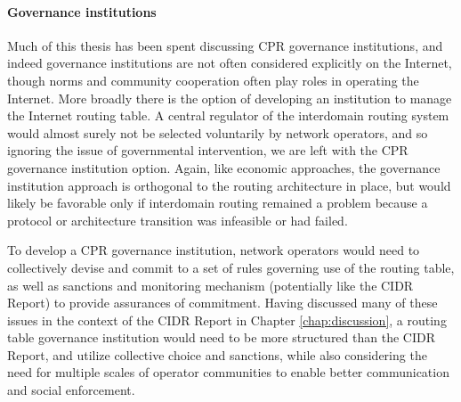 %
%
%
%

\paragraph{Governance institutions}

Much of this thesis has been spent discussing CPR governance institutions, and
indeed governance institutions are not often considered explicitly on the
Internet, though norms and community cooperation often play roles in operating
the Internet. More broadly there is the option of developing an institution to
manage the Internet routing table. A central regulator of the interdomain
routing system would almost surely not be selected voluntarily by network
operators, and so ignoring the issue of governmental intervention, we are left
with the CPR governance institution option. Again, like economic approaches,
the governance institution approach is orthogonal to the routing architecture
in place, but would likely be favorable only if interdomain routing remained a
problem because a protocol or architecture transition was infeasible or had
failed.

To develop a CPR governance institution, network operators would need to
collectively devise and commit to a set of rules governing use of the routing
table, as well as sanctions and monitoring mechanism (potentially like the
CIDR Report) to provide assurances of commitment. Having discussed many of
these issues in the context of the CIDR Report in Chapter
\ref{chap:discussion}, a routing table governance institution would need to be
more structured than the CIDR Report, and utilize collective choice and
sanctions, while also considering the need for multiple scales of operator
communities to enable better communication and social enforcement.

